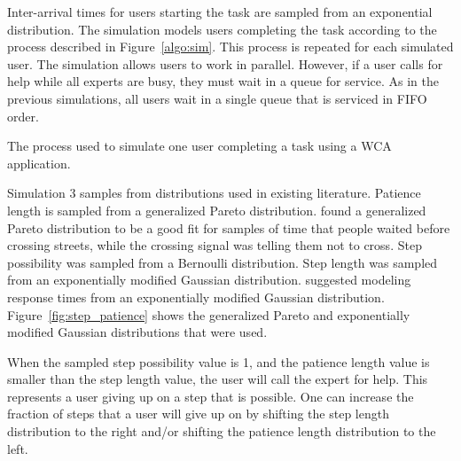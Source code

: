 Inter-arrival times for users starting the task are sampled from an exponential
distribution.
The simulation models users completing the task according to the process
described in Figure~\ref{algo:sim}.
This process is repeated for each simulated user.
The simulation allows users to work in parallel.
However, if a user calls for help while all experts are busy, they must wait in
a queue for service.
As in the previous simulations, all users wait in a single queue that is
serviced in FIFO order.

\begin{algorithm}[H]
  \caption{
    The process used to simulate one user completing a task using a WCA
    application.
  }\label{algo:sim}
\end{algorithm}

Simulation 3 samples from distributions used in existing literature.
Patience length is sampled from a generalized Pareto distribution.
\citet{patience} found a generalized Pareto distribution to be a good fit for
samples of time that people waited before crossing streets, while the crossing
signal was telling them not to cross.
Step possibility was sampled from a Bernoulli distribution.
Step length was sampled from an exponentially modified Gaussian distribution.
\citet{dawson1988fitting} suggested modeling response times from an
exponentially modified Gaussian distribution.
Figure~\ref{fig:step_patience} shows the generalized Pareto and exponentially
modified Gaussian distributions that were used.

When the sampled step possibility value is 1, and the patience length value is
smaller than the step length value, the user will call the expert for help.
This represents a user giving up on a step that is possible.
One can increase the fraction of steps that a user will give up on by shifting
the step length distribution to the right and/or shifting the patience length
distribution to the left.

